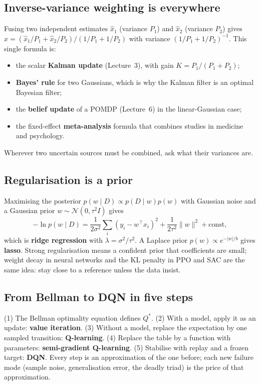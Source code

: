 \documentclass[11pt]{article}
\begin{document}
\subsection{Inverse-variance weighting is everywhere}
Fusing two independent estimates $\hat x_1$ (variance $P_1$) and $\hat x_2$ (variance $P_2$) gives $\hat x=(\hat x_1/P_1+\hat x_2/P_2)/(1/P_1+1/P_2)$ with variance $(1/P_1+1/P_2)^{-1}$. This single formula is:
\begin{itemize}
\item the scalar \textbf{Kalman update} (Lecture~3), with gain $K=P_1/(P_1+P_2)$;
\item \textbf{Bayes' rule} for two Gaussians, which is why the Kalman filter is an optimal Bayesian filter;
\item the \textbf{belief update} of a POMDP (Lecture~6) in the linear-Gaussian case;
\item the fixed-effect \textbf{meta-analysis} formula that combines studies in medicine and psychology.
\end{itemize}
Wherever two uncertain sources must be combined, ask what their variances are.

\subsection{Regularisation is a prior}
Maximising the posterior $p(w\mid D)\propto p(D\mid w)p(w)$ with Gaussian noise and a Gaussian prior $w\sim\mathcal N(0,\tau^2I)$ gives
\[-\ln p(w\mid D)=\frac1{2\sigma^2}\sum_i(y_i-w^\top x_i)^2+\frac1{2\tau^2}\|w\|^2+\text{const},\]
which is \textbf{ridge regression} with $\lambda=\sigma^2/\tau^2$. A Laplace prior $p(w)\propto e^{-|w|/b}$ gives \textbf{lasso}. Strong regularisation means a confident prior that coefficients are small; weight decay in neural networks and the KL penalty in PPO and SAC are the same idea: stay close to a reference unless the data insist.

\subsection{From Bellman to DQN in five steps}
(1) The Bellman optimality equation defines $Q^*$. (2) With a model, apply it as an update: \textbf{value iteration}. (3) Without a model, replace the expectation by one sampled transition: \textbf{Q-learning}. (4) Replace the table by a function with parameters: \textbf{semi-gradient Q-learning}. (5) Stabilise with replay and a frozen target: \textbf{DQN}. Every step is an approximation of the one before; each new failure mode (sample noise, generalisation error, the deadly triad) is the price of that approximation.
\end{document}
